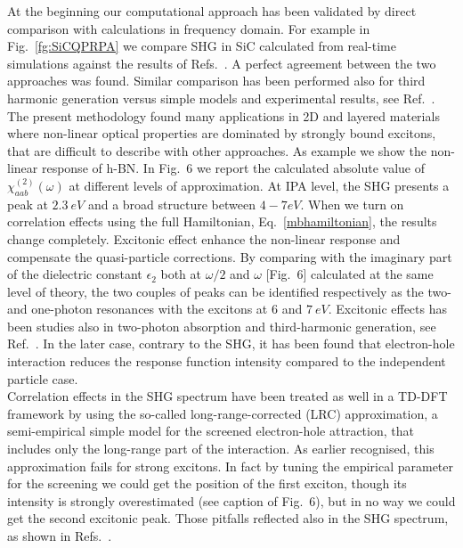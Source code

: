 At the beginning our computational approach has been validated by direct comparison with calculations in frequency domain. For example in Fig.~\ref{fg:SiCQPRPA} we compare SHG in SiC calculated from real-time simulations against the results of Refs.~\cite{PhysRevB.82.235201,PSSB.427.1984}. A perfect agreement between the two approaches was found. Similar comparison has been performed also for third harmonic generation versus simple models and experimental results, see Ref.~.\\
The present methodology found many applications in 2D and layered materials\cite{attaccalite2015strong,wei2019second,beach2020strain,mishra2020exciton,attaccalite2019second} where non-linear optical properties are dominated by strongly bound excitons, that are difficult to describe with other approaches. As example we show the non-linear response of h-BN. In Fig.~6
we report the calculated absolute value of $\chi^{(2)}_{aab} (\omega)$ at different levels of approximation. 
At IPA level, the SHG presents a peak at $2.3~eV$ and a broad structure between $4 - 7 eV$. When we turn on correlation effects using the full Hamiltonian, Eq.~\eqref{mbhamiltonian}, the results change completely.
Excitonic effect enhance the non-linear response and compensate the quasi-particle corrections. By comparing with the imaginary part of the dielectric constant $\epsilon_2$ both at $\omega/2$ and  $\omega$ [Fig.~6] calculated at the same level of theory, the two couples of peaks can be identified respectively as the two- and one-photon resonances with the excitons at $6$ and $7~eV$. 
Excitonic effects has been studies also in two-photon absorption and third-harmonic generation, see Ref.~. In the later case, contrary to the SHG, it has been found that electron-hole interaction reduces the response function intensity compared to the independent particle case.\\ 
Correlation effects in the SHG spectrum have been treated as well in a TD-DFT framework\cite{PhysRevB.82.235201} by using the so-called long-range-corrected (LRC) approximation,\cite{LRC} a semi-empirical simple model for the screened electron-hole attraction, that includes only the long-range part of the interaction. %
As earlier recognised, this approximation fails for strong excitons. In fact by tuning the empirical parameter for the screening we could get the position of the first exciton, though its intensity is strongly overestimated (see caption of Fig.~6), but in no way we could get the second excitonic peak. Those pitfalls reflected also in the SHG spectrum, as shown in Refs.~\cite{gruningtddf1,gruningtddf2}. 
